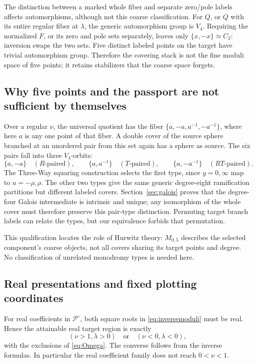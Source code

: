 The distinction between a marked whole fiber and separate zero/pole labels affects automorphisms, although not this coarse classification. For \(Q\), or \(Q\) with its entire regular fiber at \(\lambda\), the generic automorphism group is \(V_4\). Requiring the normalized \(F\), or its zero and pole sets separately, leaves only \(\{x,-x\}\simeq C_2\): inversion swaps the two sets. Five distinct labeled points on the target have trivial automorphism group. Therefore the covering stack is not the fine moduli space of five points; it retains stabilizers that the coarse space forgets.


\subsection{Why five points and the passport are not sufficient by themselves}
Over a regular \(\nu\), the universal quotient has the fiber
\(\{a,-a,a^{-1},-a^{-1}\}\), where here \(a\) is any one point of that fiber. A double cover of the source sphere branched at an unordered pair from this set again has a sphere as source. The six pairs fall into three \(V_4\)-orbits:
\[
\{a,-a\}\quad(R\text{-paired}),\qquad
\{a,a^{-1}\}\quad(T\text{-paired}),\qquad
\{a,-a^{-1}\}\quad(RT\text{-paired}).
\]
The Three-Way squaring construction selects the first type, since \(y=0,\infty\) map to \(u=-\rho,\rho\). The other two types give the same generic degree-eight ramification partitions but different labeled covers. Section~\ref{sec:galois} proves that the degree-four Galois intermediate is intrinsic and unique; any isomorphism of the whole cover must therefore preserve this pair-type distinction. Permuting target branch labels can relate the types, but our equivalence forbids that permutation.

This qualification locates the role of Hurwitz theory: \(M_{0,5}\) describes the selected component's coarse objects, not all covers sharing its target points and degree. No classification of unrelated monodromy types is needed here.

\subsection{Real presentations and fixed plotting coordinates}
For real coefficients in \(\mathcal P^\circ\), both square roots in \eqref{eq:inversemoduli} must be real. Hence the attainable real target region is exactly
\begin{equation}\label{eq:realmoduli}
(\nu>1,\lambda>0)\quad\text{or}\quad(\nu<0,\lambda<0),
\end{equation}
with the exclusions of \eqref{eq:Omega}. The converse follows from the inverse formulas. In particular the real coefficient family does not reach \(0<\nu<1\).

